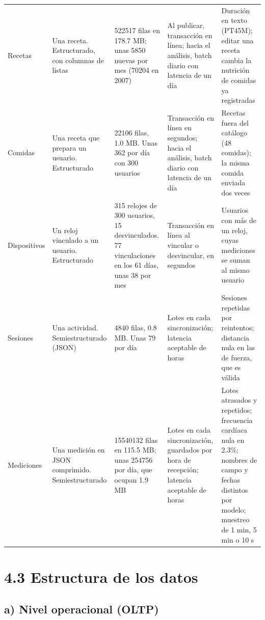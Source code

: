 \documentclass[11pt]{article}
\begin{document}
\begingroup\iniciartabla\footnotesize
\begin{tabularx}{\textwidth}{|L{1.75cm}|L{2.7cm}|Y|Y|Y|}\hline
{} &  &
 &  &
\\\hline
Recetas & Una receta. Estructurado, con columnas de listas &
522517 filas en 178.7 MB; unas 5850 nuevas por mes (70204 en 2007) &
Al publicar, transacción en línea; hacia el análisis, batch diario con latencia de un día &
Duración en texto (PT45M); editar una receta cambia la nutrición de comidas ya registradas\\\hline
Comidas & Una receta que prepara un usuario. Estructurado &
22106 filas, 1.0 MB. Unas 362 por día con 300 usuarios &
Transacción en línea en segundos; hacia el análisis, batch diario con latencia de un día &
Recetas fuera del catálogo (48 comidas); la misma comida enviada dos veces\\\hline
Dispositivos & Un reloj vinculado a un usuario. Estructurado &
315 relojes de 300 usuarios, 15 desvinculados. 77 vinculaciones en los 61 días, unas 38 por mes &
Transacción en línea al vincular o desvincular, en segundos &
Usuarios con más de un reloj, cuyas mediciones se suman al mismo usuario\\\hline
Sesiones & Una actividad. Semiestructurado (JSON) &
4840 filas, 0.8 MB. Unas 79 por día &
Lotes en cada sincronización; latencia aceptable de horas &
Sesiones repetidas por reintentos; distancia nula en las de fuerza, que es válida\\\hline
Mediciones & Una medición en JSON comprimido. Semiestructurado &
15540132 filas en 115.5 MB; unas 254756 por día, que ocupan 1.9 MB &
Lotes en cada sincronización, guardados por hora de recepción; latencia aceptable de horas &
Lotes atrasados y repetidos; frecuencia cardíaca nula en 2.3\%; nombres de campo y fechas distintos por modelo; muestreo de 1 min, 5 min o 10 s\\\hline
\end{tabularx}
\endgroup

\section{4.3 Estructura de los datos}

\subsection{a) Nivel operacional (OLTP)}
\end{document}
